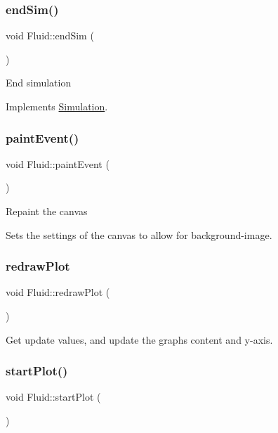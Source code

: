 \subsubsection{\texorpdfstring{endSim()}{endSim()}}
{\footnotesize\ttfamily void Fluid\+::end\+Sim (\begin{DoxyParamCaption}{ }\end{DoxyParamCaption})\hspace{0.3cm}{\ttfamily [virtual]}}

End simulation 

Implements \mbox{\hyperlink{classSimulation_ab496d124202f55e741db7db9a304a7ee}{Simulation}}.

\mbox{\label{classFluid_a9f4b99a8c95a81cce3c0463607a997bb}} 
\subsubsection{\texorpdfstring{paintEvent()}{paintEvent()}}
{\footnotesize\ttfamily void Fluid\+::paint\+Event (\begin{DoxyParamCaption}\item[{Q\+Paint\+Event $\ast$}]{ }\end{DoxyParamCaption})}

Repaint the canvas

Sets the settings of the canvas to allow for background-\/image. \mbox{\label{classFluid_a020c8985824d3d7be033cb2916d77c24}} 
\subsubsection{\texorpdfstring{redrawPlot}{redrawPlot}}
{\footnotesize\ttfamily void Fluid\+::redraw\+Plot (\begin{DoxyParamCaption}{ }\end{DoxyParamCaption})\hspace{0.3cm}{\ttfamily [slot]}}

Get update values, and update the graph\textquotesingle{}s content and y-\/axis. \mbox{\label{classFluid_ae7c7a362e1c6fcf2c88bfbf8f1836a52}} 
\subsubsection{\texorpdfstring{startPlot()}{startPlot()}}
{\footnotesize\ttfamily void Fluid\+::start\+Plot (\begin{DoxyParamCaption}{ }\end{DoxyParamCaption})}

